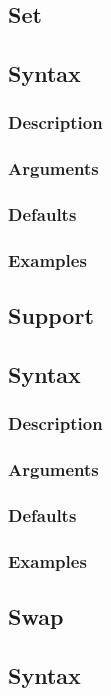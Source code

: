 \documentclass[11pt]{article}
\begin{document}
\begin{itemize}
	\subsection{Set}
		\subsection{Syntax}
		\subsubsection{Description}
		\subsubsection{Arguments}
		\subsubsection{Defaults}
		\subsubsection{Examples}
	
	\subsection{Support}
		\subsection{Syntax}
		\subsubsection{Description}
		\subsubsection{Arguments}
		\subsubsection{Defaults}
		\subsubsection{Examples}
		
	\subsection{Swap} 
		\subsection{Syntax}

\end{itemize}
\end{document}
